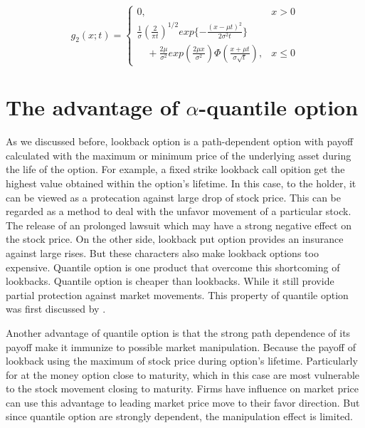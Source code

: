 \documentclass[12pt,oneside,titlepage]{book}
\begin{document}
\begin{equation}
g_2 (x;t) = \begin{cases}
0, & x > 0 \\
\frac{1}{\sigma}({\frac{2}{\pi t}})^{1/2}exp\{-\frac{(x-\mu t)^2}{2\sigma ^2 t}\} \\
\quad + \frac{2\mu}{\sigma ^2} exp(\frac{2\mu x}{\sigma ^2}) \Phi (\frac{x+\mu t}{\sigma \sqrt{t}}) , & x \leq 0
\end{cases}
\end{equation}


\section{The advantage of $\alpha$-quantile option}
As we discussed before, lookback option is a path-dependent option with payoff calculated with the maximum or minimum price of the underlying asset during the life of the option. For example, a fixed strike lookback call opition get the highest value obtained within the option's lifetime. In this case, to the holder, it can be viewed as a protecation against large drop of stock price. This can be regarded as a method to deal with the unfavor movement of a particular stock. The release of an prolonged lawsuit which may have a strong negative effect on the stock price. On the other side, lookback put option provides an insurance against large rises. But these characters also make lookback options too expensive. Quantile option is one product that overcome this shortcoming of lookbacks. Quantile option is cheaper than lookbacks. While it still provide partial protection against market movements. This property of quantile option was first discussed by \cite{Ballotta2001}.


Another advantage of quantile option is that the strong path dependence of its payoff make it immunize to possible market manipulation. Because the payoff of lookback using the maximum of stock price during option's lifetime. Particularly for at the money option close to maturity, which in this case are most vulnerable to the stock movement closing to maturity. Firms have influence on market price can use this advantage to leading market price move to their favor direction. But since quantile option are strongly dependent, the manipulation effect is limited. 
\end{document}
